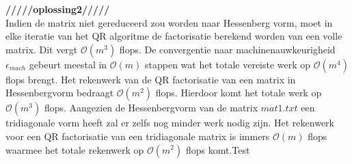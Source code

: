 \documentclass[a4paper]{article}
\begin{document}
\textbf{/////oplossing2/////}\\
Indien de matrix niet gereduceerd zou worden naar Hessenberg vorm, moet in elke iteratie van het QR algoritme de factorisatie berekend worden van een volle matrix. Dit vergt $\mathcal{O}(m^{3})$ flops. De convergentie naar machinenauwkeurigheid $\epsilon _{mach}$ gebeurt meestal in $\mathcal{O}(m)$ stappen wat het totale vereiste werk op $\mathcal{O}(m^{4})$ flops brengt. Het rekenwerk van de QR factorisatie van een matrix in Hessenbergvorm bedraagt $\mathcal{O}(m^{2})$ flops. Hierdoor komt het totale werk op $\mathcal{O}(m^{3})$ flops. Aangezien de Hessenbergvorm van de matrix $mat1.txt$ een tridiagonale vorm heeft zal er zelfs nog minder werk nodig zijn. Het rekenwerk voor een QR factorisatie van een tridiagonale matrix is immers $\mathcal{O}(m)$ flops waarmee het totale rekenwerk op $\mathcal{O}(m^{2})$ flops komt.Test
\end{document}
